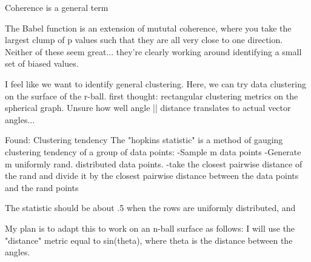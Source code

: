 \documentclass[12pt]{article}
\begin{document}
Coherence is a general term 


The Babel function is an extension of mututal coherence, where you take the largest clump of p values such that they are all very close to one direction. 
Neither of these seem great... they're clearly working around identifying a small set of biased values.

I feel like we want to identify general clustering. Here, we can try data clustering on the surface of the r-ball.
first thought: rectangular clustering metrics on the spherical graph. Unsure how well angle || distance translates to actual vector angles...

Found: Clustering tendency
The "hopkins statistic" is a method of gauging clustering tendency of a group of data points:
	-Sample m data points
	-Generate m uniformly rand. distributed data points.
	-take the closest pairwise distance of the rand and divide it by the closest pairwise distance between the data points and the rand points

The statistic should be about .5 when the rows are uniformly distributed, and 

My plan is to adapt this to work on an n-ball surface as follows:
I will use the "distance" metric equal to sin(theta), where theta is the distance between the angles.
\end{document}
